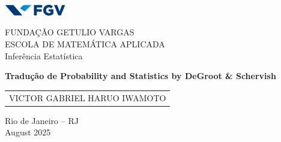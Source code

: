 \begin{titlepage}
    \centering 


    \includegraphics[width=0.2\textwidth]{img/fgv.png} 
    
    \vspace{0.3cm} 

    {\Large FUNDAÇÃO GETULIO VARGAS \\}
    {\normalsize ESCOLA DE MATEMÁTICA APLICADA \\}
    {\normalsize Inferência Estatística}

    \vfill 

    {\bfseries\Large Tradução de Probability and Statistics by DeGroot \& Schervish }

    \vfill 

    \begin{tabular}{c}
        VICTOR GABRIEL HARUO IWAMOTO \\
    \end{tabular}

    \vspace{2.5cm} 

    {Rio de Janeiro -- RJ \\} 
    {August 2025}

\end{titlepage}